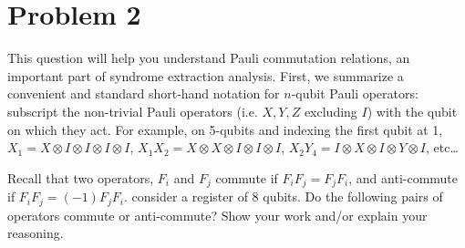 \documentclass[10pt]{article}
\begin{document}
	\section*{Problem 2}
	This question will help you understand Pauli commutation relations, an important part of 
	syndrome extraction analysis. First, we summarize a convenient and standard short-hand notation 
	for \( n \)-qubit Pauli operators: subscript the non-trivial Pauli operators (i.e. \( X, Y, Z \) excluding
	\( I \)) with the qubit on which they act. For example, on 5-qubits and indexing 
	the first qubit at 1, \( X_1 = X \otimes I \otimes I \otimes I \otimes I \), 
	\( X_1X_2 = X \otimes X \otimes I \otimes I \otimes I \), \( X_2Y_4 = I \otimes X \otimes I \otimes Y \otimes I\),
	etc\dots

	Recall that two operators, \( F_i \) and \( F_j \) commute if \( F_i F_j = F_j F_i \), and anti-commute 
	if \( F_iF_j = (-1)F_jF_i \). consider a register of 8 qubits. Do the following pairs of operators commute or 
	anti-commute? Show your work and/or explain your reasoning. 
\end{document}
